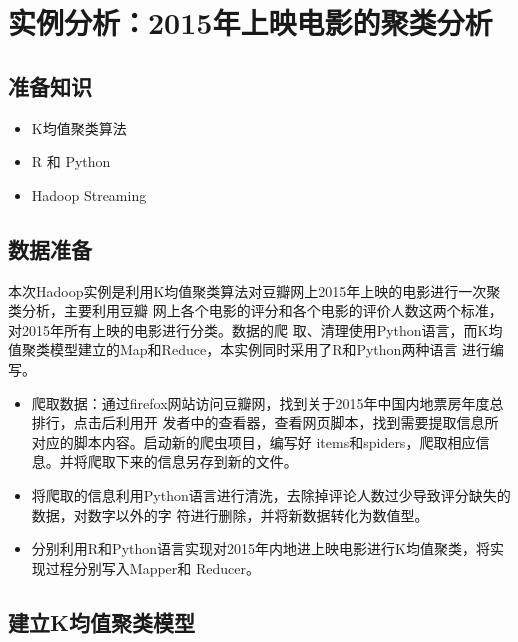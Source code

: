 \section{实例分析：2015年上映电影的聚类分析}\label{ux5b9eux4f8bux5206ux67902015ux5e74ux4e0aux6620ux7535ux5f71ux7684ux805aux7c7bux5206ux6790}

\subsection{准备知识}\label{ux51c6ux5907ux77e5ux8bc6}

\begin{itemize}
\itemsep1pt\parskip0pt
\item
  K均值聚类算法
\item
  R 和 Python
\item
  Hadoop Streaming
\end{itemize}

\subsection{数据准备}\label{ux6570ux636eux51c6ux5907}

本次Hadoop实例是利用K均值聚类算法对豆瓣网上2015年上映的电影进行一次聚类分析，主要利用豆瓣
网上各个电影的评分和各个电影的评价人数这两个标准，对2015年所有上映的电影进行分类。数据的爬
取、清理使用Python语言，而K均值聚类模型建立的Map和Reduce，本实例同时采用了R和Python两种语言
进行编写。

\begin{itemize}
\item
  爬取数据：通过firefox网站访问豆瓣网，找到关于2015年中国内地票房年度总排行，点击后利用开
  发者中的查看器，查看网页脚本，找到需要提取信息所对应的脚本内容。启动新的爬虫项目，编写好
  items和spiders，爬取相应信息。并将爬取下来的信息另存到新的文件。
\item
  将爬取的信息利用Python语言进行清洗，去除掉评论人数过少导致评分缺失的数据，对数字以外的字
  符进行删除，并将新数据转化为数值型。
\item
  分别利用R和Python语言实现对2015年内地进上映电影进行K均值聚类，将实现过程分别写入Mapper和
  Reducer。
\end{itemize}

\subsection{建立K均值聚类模型}\label{ux5efaux7acbkux5747ux503cux805aux7c7bux6a21ux578b}

